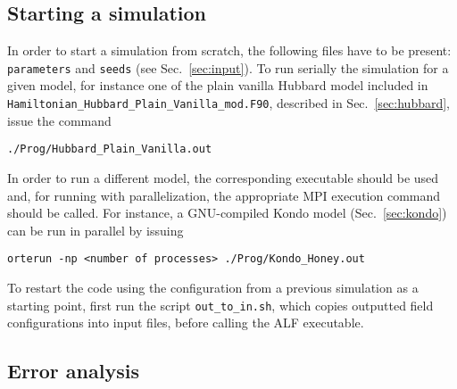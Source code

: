 %
\subsection*{Starting a simulation}
%

In order to start a simulation from scratch, the following files have to be present: \texttt{parameters} and \texttt{seeds} (see Sec.~\ref{sec:input}). 
To run serially the simulation for a given model, for instance one of the plain vanilla Hubbard model included in \texttt{Hamiltonian\_Hubbard\_Plain\_Vanilla\_mod.F90}, described in Sec.~\ref{sec:hubbard}, issue the command
\begin{lstlisting}[style=bash]
./Prog/Hubbard_Plain_Vanilla.out
\end{lstlisting}
In order to run a different model, the corresponding executable should be used and, for running with parallelization, the appropriate MPI execution command should be called. For instance, a GNU-compiled Kondo model (Sec.~\ref{sec:kondo}) can be run in parallel by issuing  
  \begin{lstlisting}[style=bash]
orterun -np <number of processes> ./Prog/Kondo_Honey.out
\end{lstlisting}


To restart the code using the configuration from a previous simulation as a starting point, first run the script \texttt{out\_to\_in.sh}, which copies outputted field configurations into input files, before calling the ALF executable.

%
\subsection{Error analysis}\label{sec:analysis}
%

